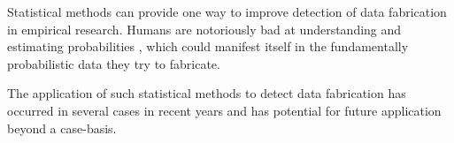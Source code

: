 \documentclass{article}
\begin{document}
Statistical methods can provide one way to improve detection of data fabrication in empirical research. Humans are notoriously bad at understanding and estimating probabilities \citep[e.g.,][]{tversky1974, Tversky1971}, which could manifest itself in the fundamentally probabilistic data they try to fabricate. 

The application of such statistical methods to detect data fabrication has occurred in several cases in recent years and has potential for future application beyond a case-basis. 
\end{document}
